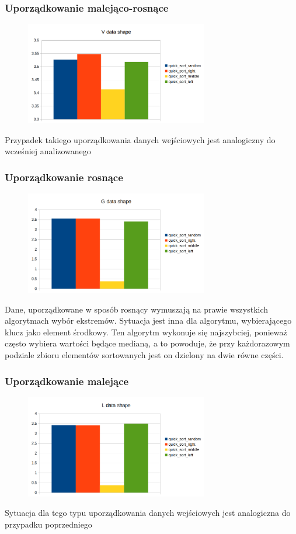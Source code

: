 \documentclass[]{article}
\begin{document}
		\subsubsection{Uporządkowanie malejąco-rosnące}
		\begin{figure}[H]
			\centering
			\includegraphics[width=8cm]{quick_sort_v.png}	
		\end{figure}
		Przypadek takiego uporządkowania danych wejściowych jest analogiczny do wcześniej analizowanego
		\subsubsection{Uporządkowanie rosnące}
		\begin{figure}[H]
			\centering
			\includegraphics[width=8cm]{quick_sort_g.png}	
		\end{figure}
		Dane, uporządkowane w sposób rosnący wymuszają na prawie wszystkich algorytmach wybór ekstremów. Sytuacja jest inna dla algorytmu, wybierającego klucz jako element środkowy. Ten algorytm wykonuje się najszybciej, ponieważ często wybiera wartości będące medianą, a to powoduje, że przy każdorazowym podziale zbioru elementów sortowanych jest on dzielony na dwie równe części.
		\subsubsection{Uporządkowanie malejące}
		\begin{figure}[H]
			\centering
			\includegraphics[width=8cm]{quick_sort_l.png}	
		\end{figure}
		Sytuacja dla tego typu uporządkowania danych wejściowych jest analogiczna do przypadku poprzedniego
\end{document}
